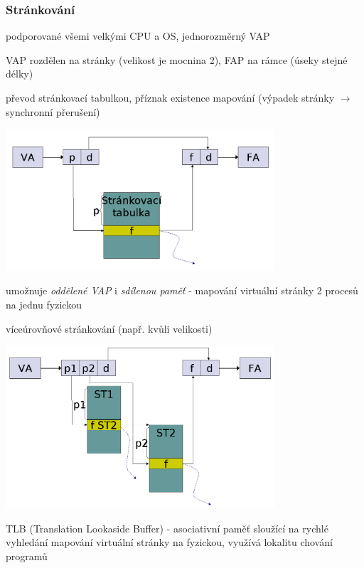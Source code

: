 \subsubsection*{Stránkování}
podporované všemi velkými CPU a OS, jednorozměrný VAP
\begin{pitemize}
	\item VAP rozdělen na stránky (velikost je mocnina 2), FAP na rámce (úseky stejné délky)
	\item převod stránkovací tabulkou, příznak existence mapování (výpadek stránky $\rightarrow$ synchronní přerušení)
		\par \begin{center}\includegraphics[width=10cm]{informatika/operacne_systemy_a_hw/obrazky/strankovani1.png}\end{center}
	\item umožnuje \emph{oddělené VAP} i \emph{sdílenou paměť} - mapování virtuální stránky 2 procesů na jednu fyzickou
	\item víceúrovňové stránkování (např. kvůli velikosti)
		\par \begin{center} \includegraphics[width=10cm]{informatika/operacne_systemy_a_hw/obrazky/strankovani2.png} \end{center}
	\item TLB (Translation Lookaside Buffer) - asociativní paměť sloužící na rychlé vyhledání mapování virtuální stránky na fyzickou, využívá lokalitu chování programů

\end{pitemize}
